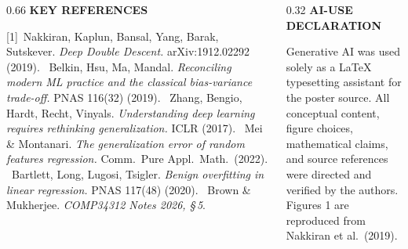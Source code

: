 \documentclass[final]{beamer}
\newcommand{\eyebrow}[1]{{\color{uompurple}\scriptsize\bfseries\MakeUppercase{#1}}\par\vspace{-0.2ex}}
\begin{document}
\begin{frame}[t]{}
\begin{columns}[T,onlytextwidth]
\begin{column}{0.66\linewidth}
\eyebrow{Key references}\vspace{-0.5ex}
{\scriptsize
[1]~Nakkiran, Kaplun, Bansal, Yang, Barak, Sutskever. \emph{Deep Double Descent.} arXiv:1912.02292 (2019). \;
[2]~Belkin, Hsu, Ma, Mandal. \emph{Reconciling modern ML practice and the classical bias-variance trade-off.} PNAS 116(32) (2019). \;
[3]~Zhang, Bengio, Hardt, Recht, Vinyals. \emph{Understanding deep learning requires rethinking generalization.} ICLR (2017). \;
[4]~Mei \& Montanari. \emph{The generalization error of random features regression.} Comm.\ Pure Appl.\ Math.\ (2022). \;
[5]~Bartlett, Long, Lugosi, Tsigler. \emph{Benign overfitting in linear regression.} PNAS 117(48) (2020). \;
[6]~Brown \& Mukherjee. \emph{COMP34312 Notes 2026, \S\,5}.
}
\end{column}
\begin{column}{0.32\linewidth}
\eyebrow{AI-use declaration}\vspace{-0.5ex}
{\scriptsize
Generative AI was used solely as a \LaTeX{} typesetting assistant for the poster source. All conceptual content, figure choices, mathematical claims, and source references were directed and verified by the authors. Figures 1 are reproduced from Nakkiran et al.\ (2019).
}
\end{column}
\end{columns}

\end{frame}
\end{document}
